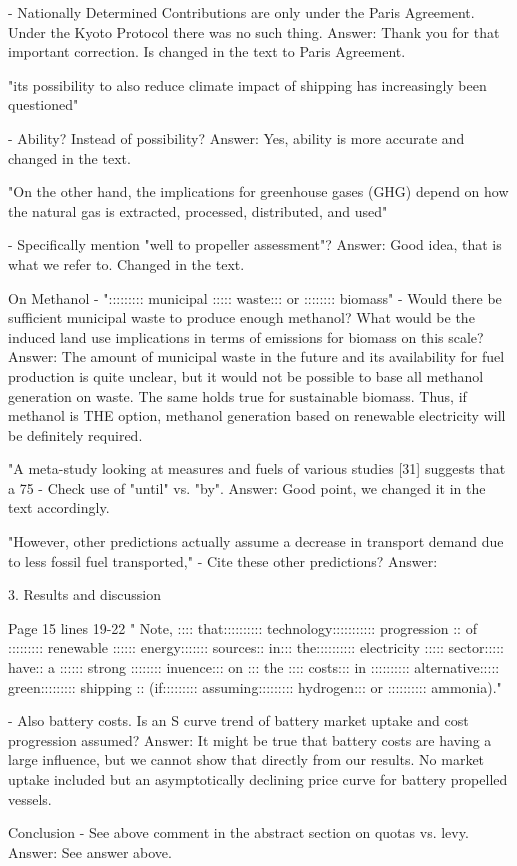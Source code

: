 -	Nationally Determined Contributions are only under the Paris Agreement. Under the Kyoto Protocol there was no such thing.
Answer: Thank you for that important correction. Is changed in the text to Paris Agreement.

"its possibility to also reduce climate impact of shipping has increasingly been questioned"

-	Ability? Instead of possibility?
Answer: Yes, ability is more accurate and changed in the text.

"On the other hand, the implications for greenhouse gases (GHG) depend on how the natural gas is extracted, processed, distributed, and used"

-	Specifically mention "well to propeller assessment"?
Answer: Good idea, that is what we refer to. Changed in the text.

On Methanol - "::::::::: municipal ::::: waste::: or :::::::: biomass"
-	Would there be sufficient municipal waste to produce enough methanol? What would be the induced land use implications in terms of emissions for biomass on this scale?
Answer: The amount of municipal waste in the future and its availability for fuel production is quite unclear, but it would not be possible to base all methanol generation on waste. The same holds true for sustainable biomass. Thus, if methanol is THE option, methanol generation based on renewable electricity will be definitely required.


"A meta-study looking at measures and fuels of various studies [31] suggests that a 75%
-	Check use of "until" vs. "by".
Answer: Good point, we changed it in the text accordingly.

"However, other predictions actually assume a decrease in transport demand due to less fossil fuel transported,"
-	Cite these other predictions?
Answer:

3. Results and discussion 

Page 15 lines 19-22
 " Note, :::: that:::::::::: technology::::::::::: progression :: of
::::::::: renewable :::::: energy::::::: sources:: in::: the:::::::::: electricity ::::: sector::::: have:: a :::::: strong :::::::: inuence::: on ::: the
:::: costs::: in :::::::::: alternative::::: green::::::::: shipping :: (if::::::::: assuming::::::::: hydrogen::: or :::::::::: ammonia)."

-	Also battery costs. Is an S curve trend of battery market uptake and cost progression assumed?
Answer: It might be true that battery costs are having a large influence, but we cannot show that directly from our results. No market uptake included but an asymptotically declining price curve for battery propelled vessels.

Conclusion
-	See above comment in the abstract section on quotas vs. levy. 
Answer: See answer above.
